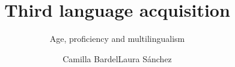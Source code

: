 \renewcommand{\lsSeries}{eurosla}
\renewcommand{\lsSeriesNumber}{}

\title{Third language acquisition}
\subtitle{Age, proficiency and multilingualism}
\author{Camilla Bardel\lastand Laura Sánchez}
